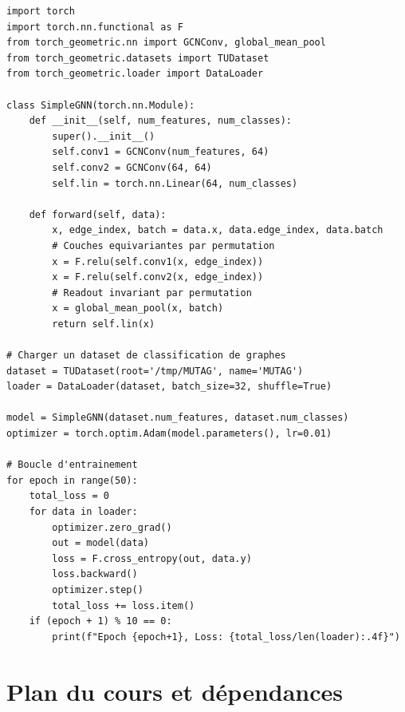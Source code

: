 \begin{codeblock}[title=\textbf{Premier GNN avec PyTorch Geometric}]
\begin{verbatim}
import torch
import torch.nn.functional as F
from torch_geometric.nn import GCNConv, global_mean_pool
from torch_geometric.datasets import TUDataset
from torch_geometric.loader import DataLoader

class SimpleGNN(torch.nn.Module):
    def __init__(self, num_features, num_classes):
        super().__init__()
        self.conv1 = GCNConv(num_features, 64)
        self.conv2 = GCNConv(64, 64)
        self.lin = torch.nn.Linear(64, num_classes)

    def forward(self, data):
        x, edge_index, batch = data.x, data.edge_index, data.batch
        # Couches equivariantes par permutation
        x = F.relu(self.conv1(x, edge_index))
        x = F.relu(self.conv2(x, edge_index))
        # Readout invariant par permutation
        x = global_mean_pool(x, batch)
        return self.lin(x)

# Charger un dataset de classification de graphes
dataset = TUDataset(root='/tmp/MUTAG', name='MUTAG')
loader = DataLoader(dataset, batch_size=32, shuffle=True)

model = SimpleGNN(dataset.num_features, dataset.num_classes)
optimizer = torch.optim.Adam(model.parameters(), lr=0.01)

# Boucle d'entrainement
for epoch in range(50):
    total_loss = 0
    for data in loader:
        optimizer.zero_grad()
        out = model(data)
        loss = F.cross_entropy(out, data.y)
        loss.backward()
        optimizer.step()
        total_loss += loss.item()
    if (epoch + 1) % 10 == 0:
        print(f"Epoch {epoch+1}, Loss: {total_loss/len(loader):.4f}")
\end{verbatim}
\end{codeblock}

\section{Plan du cours et d\'ependances}

